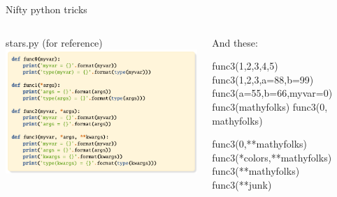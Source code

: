 \documentclass[aspectratio=149] {beamer}
\begin{document}
\begin{frame}[fragile,t]{ Nifty python tricks}

  \begin{columns}
    \begin{column}[t]{.48\textwidth}
      stars.py (for reference)
      \includegraphics[scale=.85, trim= 0 0 7cm 0, clip]{stars.pdf}
    \end{column}
   
    \begin{column}[t]{.48\textwidth}
      And these:
      \begin{pythoncode}
        func3(1,2,3,4,5)
        func3(1,2,3,a=88,b=99)        
        func3(a=55,b=66,myvar=0)
        func3(mathyfolks)
        func3(0, mathyfolks)
      \end{pythoncode}
  
      \pause
      \begin{pythoncode}
        func3(0,**mathyfolks)
        func3(*colors,**mathyfolks)
        func3(**mathyfolks)
        func3(**junk)
      \end{pythoncode}
    \end{column}
  \end{columns}

\end{frame}
\end{document}
